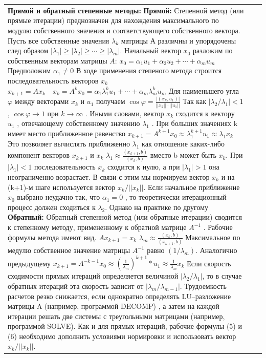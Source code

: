 \documentclass[a4paper,2pt]{article}
\begin{document}
\begin{tabular}{|p{}|p{}|p{}|} %
    \hline
    \\\hline


    \textbf{Прямой и обратный степенные методы:}
    \textbf{Прямой:} Степенной метод (или прямые итерации) преднозначен для нахождения максимального по модулю собственного значения и соответствующего собственного вектора. Пусть все собственные значения \(\lambda_k\) матрицы А различны и упорядочены след образом \(|\lambda_1| \geq |\lambda_2| \geq \cdots \geq |\lambda_m|\).
    Начальный вектор \(x_0\) разложим по собственным векторам матрицы \(A\): \(x_0 = \alpha_1 u_1 + \alpha_2 u_2 + \cdots + \alpha_m u_m\)
    Предположим \(\alpha_1 \neq 0\) В ходе применения степеного метода строится последовательность векторов \(x_k\)
    \(x_{k+1} = Ax_k \quad x_k = A^k x_0 = \alpha_1 \lambda_1^k u_1 + \cdots + \alpha_m \lambda_m^k u_m  \)
    Для наименьшего угла \(\varphi\) между векторами \(x_k\) и \(u_1\) получаем
    \(\cos \varphi = \frac{|(x_k, u_1)|}{||x_k|| \cdot ||u_1||}\) Так как \(|\lambda_2 / \lambda_1|<1\), \(\cos\varphi \rightarrow 1\) при \(k\rightarrow\infty\) . Иными словами, вектор \(x_k\) сходится к вектору \(u_1\) , отвечающему собственному значению \(\lambda_1\) . При больших значениях k имеет место приближенное равенство
    \(x_{k+1} = A^{k+1}x_0 \approx \lambda_1^{k+1}u_1 \approx \lambda_1 x_k \)
    Это позволяет вычислять приближенно \(\lambda_1\) как отношение каких-либо компонент векторов \(x_{k+1}\) и \(x_{k}\)
    \(   \lambda_1 \approx \frac{(x_{k+1}, b)}{(x_k, b)} \)
    вместо b может быть $x_k$.
    При \(|\lambda_1|<1\) последовательность $x_k$ сходится к нулю, а при \(|\lambda_1|>1\) она неограниченно возрастает. В связи с этим мы нормируем вектор $x_k$ и на (k+1)-м шаге используется вектор \(x_k/||x_k||\).
    Если начальное приближение $x_0$ выбрано неудачно так, что \(\alpha_1=0\) , то теоретически итерационный процесс должен сходиться к $\lambda_2$. Однако на практике по другому
    \textbf{Обратный:} Обратный степенной метод (или обратные итерации) сводится к степенному методу, примененному к обратной матрице $A^{-1}$ . Рабочие формулы метода имеют вид.
    \( Ax_{k+1} = x_k \) \( \lambda_m \approx \frac{(x_k, b)}{(x_{k+1}, b)} \) Максимальное по медулю собственное значение матрицы $A^{-1}$ равно $(1/\lambda_m)$. Аналогично предыдущему
    \( x_{k+1} = A^{-k-1}x_0 \approx(\frac{1}{\lambda_m})^{k+1} *u_1 \approx \frac{1}{\lambda_m} x_k \)
    Если скорость сходимости прямых итераций определяется величиной $|\lambda_2/\lambda_1|$, то в случае обратных итераций эта скорость зависит от $|\lambda_m/\lambda_{m-1}|$. Трудоемкость расчетов резко снижается, если однократно определять LU–разложение матрицы A (например, программой DECOMP) , а затем на каждой итерации решать две системы с треугольными матрицами (например, программой SOLVE). Как и для прямых итераций, рабочие формулы (5) и (6) необходимо дополнить условиями нормировки и использовать вектор \(x_k/||x_k||\).


\end{tabular}
\end{document}
